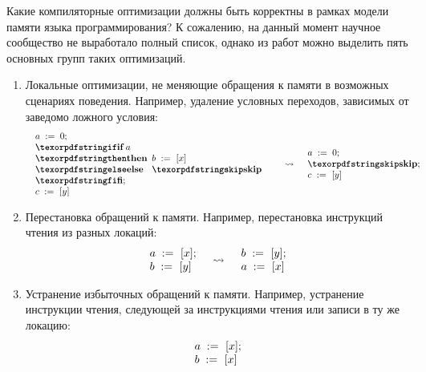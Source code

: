 Какие компиляторные оптимизации должны быть корректны в рамках модели памяти языка программирования?
К сожалению, на данный момент научное сообщество не выработало полный список, однако из работ
\cite{Vafeiadis-al:POPL15,Morisset-al:PLDI13,Sevcik-Aspinall:ECOOP08} можно выделить пять основных групп таких оптимизаций.
\begin{enumerate}
  \item Локальные оптимизации, не меняющие обращения к памяти в возможных сценариях поведения.
    Например, удаление условных переходов, зависимых от заведомо ложного условия:
    \[
      \begin{array}{l c l}
        \begin{array}{l}
        \assignInst{a}{0}; \\
        \iteml{a}{\readInst{b}{x}}{\skipc}; \\
        \readInst{c}{y} \\
        \end{array}
        & \optarrow &
        \begin{array}{l}
          \assignInst{a}{0}; \\
          \skipc; \\
          \readInst{c}{y}
        \end{array}
      \end{array}
    \]
  \item Перестановка обращений к памяти.
    Например, перестановка инструкций чтения из разных локаций:
    \[
      \begin{array}{l c l}
        \begin{array}{l}
        a \;:=_{}\;[x]; \\
        b \;:=_{}\;[y]
        \end{array}
        & \rightsquigarrow &
        \begin{array}{l}
        b \;:=_{}\;[y]; \\
        a \;:=_{}\;[x]
        \end{array}
      \end{array}
    \]
  \item Устранение избыточных обращений к памяти.
    Например, устранение инструкции чтения, следующей за инструкциями чтения или записи в ту же локацию:
    \[
    \begin{array}{c c c}
      \begin{array}{l c l}
        \begin{array}{l}
        a \;:=_{}\;[x]; \\
        b \;:=_{}\;[x]

\end{array}
\end{array}
\end{array}\]
\end{enumerate}
